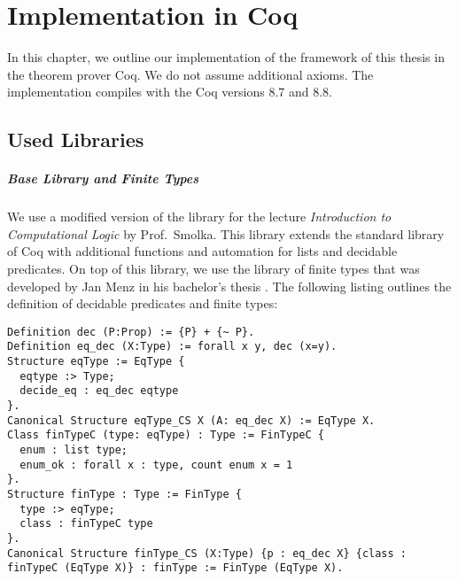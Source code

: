 \chapter{Implementation in Coq}
\label{chap:implementation}

\lstset{style=coq}







In this chapter, we outline our implementation of the framework of this thesis in the theorem prover Coq.  We do not assume additional axioms.  The
implementation compiles with the Coq versions 8.7 and 8.8.

\section{Used Libraries}
\label{sec:coq-libraries}

\paragraph{Base Library and Finite Types}

We use a modified version of the library for the lecture \textit{Introduction to Computational Logic} by Prof.\ Smolka.  This library extends the
standard library of Coq with additional functions and automation for lists and decidable predicates.  On top of this library, we use the library of
finite types that was developed by Jan Menz in his bachelor's thesis \cite{JanMenz}.  The following listing outlines the definition of decidable
predicates and finite types:

\begin{lstlisting}
Definition dec (P:Prop) := {P} + {~ P}.
Definition eq_dec (X:Type) := forall x y, dec (x=y).
Structure eqType := EqType {
  eqtype :> Type;
  decide_eq : eq_dec eqtype
}.
Canonical Structure eqType_CS X (A: eq_dec X) := EqType X.
Class finTypeC (type: eqType) : Type := FinTypeC {
  enum : list type;
  enum_ok : forall x : type, count enum x = 1
}.
Structure finType : Type := FinType {
  type :> eqType;
  class : finTypeC type
}.
Canonical Structure finType_CS (X:Type) {p : eq_dec X} {class : finTypeC (EqType X)} : finType := FinType (EqType X).
\end{lstlisting}%


